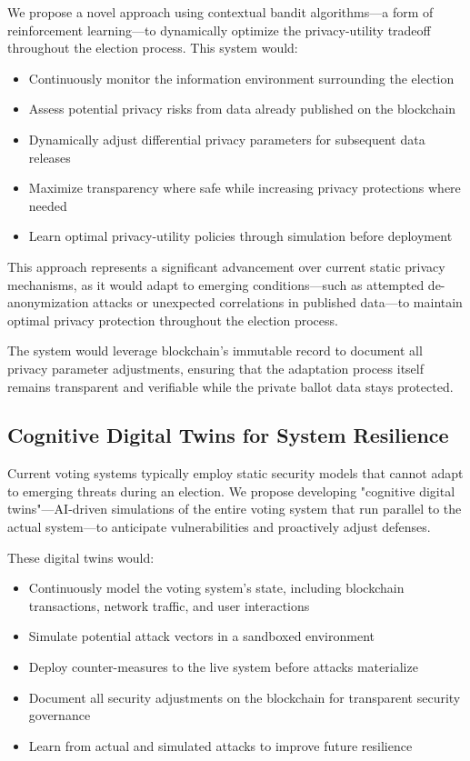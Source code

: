 \documentclass[conference]{IEEEtran}
\begin{document}
We propose a novel approach using contextual bandit algorithms—a form of reinforcement learning—to dynamically optimize the privacy-utility tradeoff throughout the election process. This system would:

\begin{itemize}
    \item Continuously monitor the information environment surrounding the election
    \item Assess potential privacy risks from data already published on the blockchain
    \item Dynamically adjust differential privacy parameters for subsequent data releases
    \item Maximize transparency where safe while increasing privacy protections where needed
    \item Learn optimal privacy-utility policies through simulation before deployment
\end{itemize}

This approach represents a significant advancement over current static privacy mechanisms, as it would adapt to emerging conditions—such as attempted de-anonymization attacks or unexpected correlations in published data—to maintain optimal privacy protection throughout the election process.

The system would leverage blockchain's immutable record to document all privacy parameter adjustments, ensuring that the adaptation process itself remains transparent and verifiable while the private ballot data stays protected.

\subsection{Cognitive Digital Twins for System Resilience}
Current voting systems typically employ static security models that cannot adapt to emerging threats during an election. We propose developing "cognitive digital twins"—AI-driven simulations of the entire voting system that run parallel to the actual system—to anticipate vulnerabilities and proactively adjust defenses.

These digital twins would:

\begin{itemize}
    \item Continuously model the voting system's state, including blockchain transactions, network traffic, and user interactions
    \item Simulate potential attack vectors in a sandboxed environment
    \item Deploy counter-measures to the live system before attacks materialize
    \item Document all security adjustments on the blockchain for transparent security governance
    \item Learn from actual and simulated attacks to improve future resilience
\end{itemize}
\end{document}
